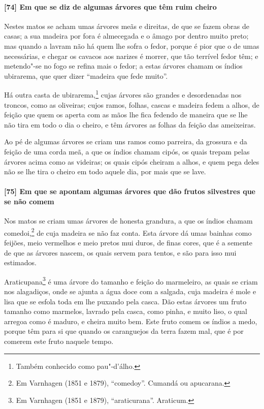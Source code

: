 \begin{linenumbers}
\paragraph{[74] Em que se diz de algumas árvores que têm ruim cheiro}\quad
Nestes matos se acham umas árvores meãs e direitas, de que se fazem obras de casas; a sua
madeira por fora é almecegada e o âmago por dentro muito preto; mas quando a lavram não há
quem lhe sofra o fedor, porque é pior que o de umas necessárias, e chegar os cavacos aos
narizes é morrer, que tão terrível fedor têm; e metendo"-se no fogo se refina mais o fedor;
a estas árvores chamam os índios ubirarema, que quer dizer ``madeira que fede muito''.

Há outra casta de ubirarema,\footnote{ Também conhecido como pau"-d'álho.} cujas árvores
são grandes e desordenadas nos troncos, como as oliveiras; cujos ramos, folhas, cascas e
madeira fedem a alhos, de feição que quem os aperta com as mãos lhe fica fedendo de
maneira que se lhe não tira em todo o dia o cheiro, e têm árvores as folhas da feição das
ameixeiras.

Ao pé de algumas árvores se criam uns ramos como parreira, da grossura e da feição de uma
corda meã, a que os índios chamam cipós, os quais trepam pelas árvores acima como as
videiras; os quais cipós cheiram a alhos, e quem pega deles não se lhe tira o cheiro em
todo aquele dia, por mais que se lave.

\paragraph{[75] Em que se apontam algumas árvores que dão frutos silvestres que se não
comem}\quad
Nos matos se criam umas árvores de honesta grandura, a que os índios chamam
comedoi,\footnote{ Em Varnhagen (1851 e 1879), ``comedoy''. Cumandá ou apucarana.} de cuja
madeira se não faz conta. Esta árvore dá umas bainhas como feijões, meio vermelhos e meio
pretos mui duros, de finas cores, que é a semente de que as árvores nascem, os quais
servem para tentos, e são para isso mui estimados.


Araticupana\footnote{ Em Varnhagen (1851 e 1879), ``araticurana''. Araticum.} é uma árvore
do tamanho e feição do marmeleiro, as quais se criam nos alagadiços, onde se ajunta a água
doce com a salgada, cuja madeira é mole e lisa que se esfola toda em lhe puxando pela
casca. Dão estas árvores um fruto tamanho como marmelos, lavrado pela casca, como pinha, e
muito liso, o qual arregoa como é maduro, e cheira muito bem. Este fruto comem os índios a
medo, porque têm para si que quando os caranguejos da terra fazem mal, que é por comerem
este fruto naquele tempo.


\end{linenumbers}
